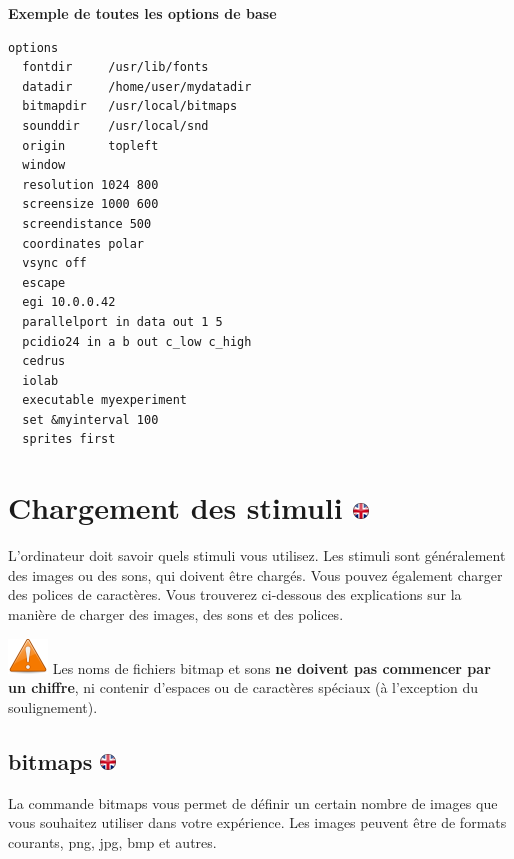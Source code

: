 \documentclass[
]{book}
\begin{document}
\textbf{Exemple de toutes les options de base}

\begin{verbatim}
options
  fontdir     /usr/lib/fonts
  datadir     /home/user/mydatadir
  bitmapdir   /usr/local/bitmaps
  sounddir    /usr/local/snd
  origin      topleft
  window
  resolution 1024 800
  screensize 1000 600
  screendistance 500
  coordinates polar
  vsync off
  escape
  egi 10.0.0.42
  parallelport in data out 1 5
  pcidio24 in a b out c_low c_high
  cedrus
  iolab
  executable myexperiment
  set &myinterval 100
  sprites first
\end{verbatim}

\hypertarget{chargement-des-stimuli}{%
\section[Chargement des stimuli ]{\texorpdfstring{Chargement des stimuli
\href{https://www.psytoolkit.org/doc3.2.0/syntax.html\#loadingstimuli}{\protect\includegraphics{img/ukflag.png}}}{Chargement des stimuli }}\label{chargement-des-stimuli}}

L'ordinateur doit savoir quels stimuli vous utilisez. Les stimuli sont
généralement des images ou des sons, qui doivent être chargés. Vous
pouvez également charger des polices de caractères. Vous trouverez
ci-dessous des explications sur la manière de charger des images, des
sons et des polices.

\includegraphics{img/attention.png} Les noms de fichiers bitmap et sons
\textbf{ne doivent pas commencer par un chiffre}, ni contenir d'espaces
ou de caractères spéciaux (à l'exception du soulignement).

\hypertarget{bitmaps}{%
\subsection[bitmaps ]{\texorpdfstring{bitmaps
\href{https://www.psytoolkit.org/doc3.2.0/syntax.html\#_bitmaps}{\protect\includegraphics{img/ukflag.png}}}{bitmaps }}\label{bitmaps}}

La commande bitmaps vous permet de définir un certain nombre de images
que vous souhaitez utiliser dans votre expérience. Les images peuvent
être de formats courants, png, jpg, bmp et autres.
\end{document}
